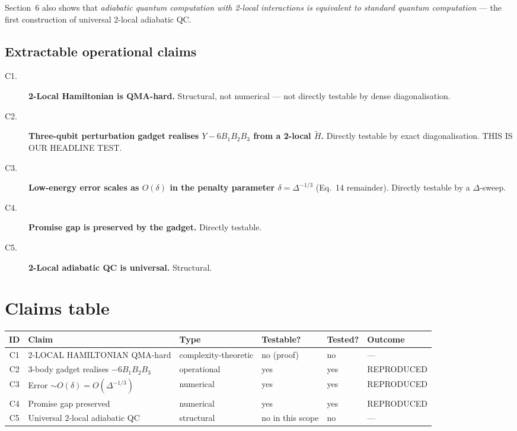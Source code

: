 \documentclass[11pt]{article}
\begin{document}
Section~6 also shows that \emph{adiabatic quantum computation with
2-local interactions is equivalent to standard quantum computation}
--- the first construction of universal 2-local adiabatic QC.

\subsection*{Extractable operational claims}
\begin{description}
\item[C1.] \textbf{2-Local Hamiltonian is QMA-hard.} Structural, not
  numerical --- not directly testable by dense diagonalisation.
\item[C2.] \textbf{Three-qubit perturbation gadget realises
  $Y - 6 B_1 B_2 B_3$ from a 2-local $\widetilde H$.} Directly testable
  by exact diagonalisation. THIS IS OUR HEADLINE TEST.
\item[C3.] \textbf{Low-energy error scales as $O(\delta)$ in the
  penalty parameter $\delta = \Delta^{-1/3}$} (Eq.~14 remainder).
  Directly testable by a $\Delta$-sweep.
\item[C4.] \textbf{Promise gap is preserved by the gadget.}  Directly
  testable.
\item[C5.] \textbf{2-Local adiabatic QC is universal.} Structural.
\end{description}

\section{Claims table}

\begin{center}
\small
\begin{tabular}{clllll}
\toprule
ID & Claim & Type & Testable? & Tested? & Outcome \\
\midrule
C1 & 2-LOCAL HAMILTONIAN QMA-hard   & complexity-theoretic & no (proof) & no  & — \\
C2 & 3-body gadget realises $-6 B_1 B_2 B_3$ & operational  & yes & yes & REPRODUCED \\
C3 & Error $\sim O(\delta) = O(\Delta^{-1/3})$ & numerical & yes & yes & REPRODUCED \\
C4 & Promise gap preserved         & numerical & yes & yes & REPRODUCED \\
C5 & Universal 2-local adiabatic QC & structural & no in this scope & no & — \\
\bottomrule
\end{tabular}
\end{center}
\end{document}
